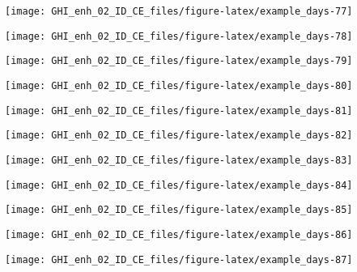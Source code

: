\documentclass[
  10pt,
  a4paper,oneside]{article}
\begin{document}
\begin{center}\texttt{[image: GHI\_enh\_02\_ID\_CE\_files/figure-latex/example\_days-77]} \end{center}

\begin{center}\texttt{[image: GHI\_enh\_02\_ID\_CE\_files/figure-latex/example\_days-78]} \end{center}

\begin{center}\texttt{[image: GHI\_enh\_02\_ID\_CE\_files/figure-latex/example\_days-79]} \end{center}

\begin{center}\texttt{[image: GHI\_enh\_02\_ID\_CE\_files/figure-latex/example\_days-80]} \end{center}

\begin{center}\texttt{[image: GHI\_enh\_02\_ID\_CE\_files/figure-latex/example\_days-81]} \end{center}

\begin{center}\texttt{[image: GHI\_enh\_02\_ID\_CE\_files/figure-latex/example\_days-82]} \end{center}

\begin{center}\texttt{[image: GHI\_enh\_02\_ID\_CE\_files/figure-latex/example\_days-83]} \end{center}

\begin{center}\texttt{[image: GHI\_enh\_02\_ID\_CE\_files/figure-latex/example\_days-84]} \end{center}

\begin{center}\texttt{[image: GHI\_enh\_02\_ID\_CE\_files/figure-latex/example\_days-85]} \end{center}

\begin{center}\texttt{[image: GHI\_enh\_02\_ID\_CE\_files/figure-latex/example\_days-86]} \end{center}

\begin{center}\texttt{[image: GHI\_enh\_02\_ID\_CE\_files/figure-latex/example\_days-87]} \end{center}
\end{document}
